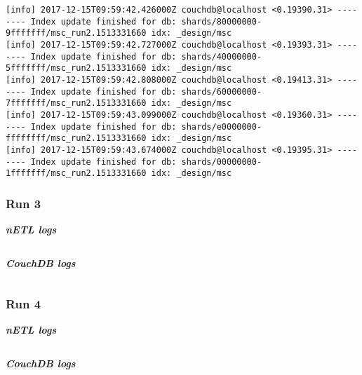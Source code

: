 \begin{verbatim}
[info] 2017-12-15T09:59:42.426000Z couchdb@localhost <0.19390.31> -------- Index update finished for db: shards/80000000-9fffffff/msc_run2.1513331660 idx: _design/msc
[info] 2017-12-15T09:59:42.727000Z couchdb@localhost <0.19393.31> -------- Index update finished for db: shards/40000000-5fffffff/msc_run2.1513331660 idx: _design/msc
[info] 2017-12-15T09:59:42.808000Z couchdb@localhost <0.19413.31> -------- Index update finished for db: shards/60000000-7fffffff/msc_run2.1513331660 idx: _design/msc
[info] 2017-12-15T09:59:43.099000Z couchdb@localhost <0.19360.31> -------- Index update finished for db: shards/e0000000-ffffffff/msc_run2.1513331660 idx: _design/msc
[info] 2017-12-15T09:59:43.674000Z couchdb@localhost <0.19395.31> -------- Index update finished for db: shards/00000000-1fffffff/msc_run2.1513331660 idx: _design/msc
\end{verbatim}


\subsubsection{Run 3}
\textit{\textbf{nETL logs}}
\begin{verbatim}
\end{verbatim}

\textit{\textbf{CouchDB logs}}
\begin{verbatim}
\end{verbatim}


\subsubsection{Run 4}
\textit{\textbf{nETL logs}}
\begin{verbatim}
\end{verbatim}

\textit{\textbf{CouchDB logs}}
\begin{verbatim}
\end{verbatim}



